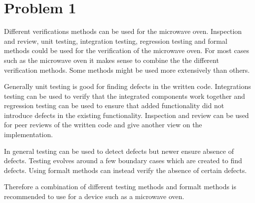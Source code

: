 \chapter{Problem 1}
\label{chp:one}


Different verifications methods can be used for the microwave oven. Inspection and review, unit testing, integration testing, regression testing and formal methods could be used for the verification of the microwave oven. For most cases such as the microwave oven it makes sense to combine the the different verification methods. Some methods might be used more extensively than others. 

Generally unit testing is good for finding defects in the written code. Integrations testing can be used to verify that the integrated components work together and regression testing can be used to ensure that added functionality did not introduce defects in the existing functionality. Inspection and review can be used for peer reviews of the written code and give another view on the implementation.

In general testing can be used to detect defects but newer ensure absence of defects. Testing evolves around a few boundary cases which are created to find defects. Using formalt methods can instead verify the absence of certain defects. 

Therefore a combination of different testing methods and formalt methods is recommended to use for a device such as a microwave oven. 


